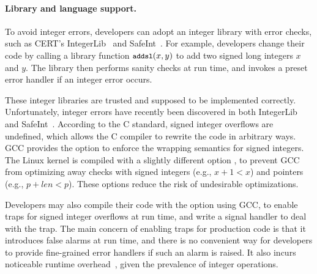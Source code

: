 \paragraph{Library and language support.}
To avoid integer errors, developers can adopt
an integer library with error checks, such as CERT's
IntegerLib~\cite[INT03-C]{seacord:secure-c}
and SafeInt~\cite{safeint}.
For example, developers
change their code by calling a library function $\cc{addsl}(x, y)$
to add two signed long integers $x$ and $y$.
The library then performs sanity checks at run time, and invokes a
preset error handler if an integer error occurs.


These integer libraries are trusted and supposed to be implemented correctly.
Unfortunately, integer errors have recently been discovered in both
IntegerLib and SafeInt~\cite{ioc}.
%
%
%
According to the C standard, signed integer overflows are undefined,
which allows the C compiler to rewrite the code in arbitrary ways.
GCC provides the option  to enforce the wrapping semantics
for signed integers.  The Linux kernel is compiled with a slightly
different option , to prevent GCC from
optimizing away checks with signed integers (e.g., $x + 1 < x$) and
pointers (e.g., $p + \mathit{len} < p$).  These options reduce the
risk of undesirable optimizations.

Developers may also compile their code with the  option
using GCC, to enable traps for signed integer overflows at run time,
and write a signal handler to deal with the trap.
The main concern of enabling traps for production code
is that it introduces false alarms at run time, and there is no
convenient way for developers to provide fine-grained error handlers
if such an alarm is raised.  It also incurs noticeable runtime
overhead~\cite{ioc}, given the prevalence of integer operations.

